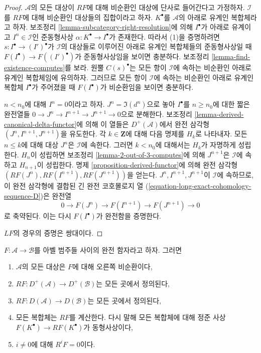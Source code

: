 \begin{proof}
$\mathcal{A}$의 모든 대상이 $RF$에 대해 비순환인 대상에 단사로
들어간다고 가정하자. $\mathcal{I}$를 $RF$에 대해 비순환인 대상들의
집합이라고 하자. $K^\bullet$를 $\mathcal{A}$의 아래로 유계인
복합체라고 하자. 보조정리 \ref{lemma-subcategory-right-resolution}에 의해
$I^\bullet$가 아래로 유계이고 $I^n \in \mathcal{I}$인 준동형사상
$\alpha : K^\bullet \to I^\bullet$가 존재한다. 따라서 (1)을 증명하려면
$s : I^\bullet \to (I')^\bullet$가 $\mathcal{I}$의 대상들로 이루어진
아래로 유계인 복합체들의 준동형사상일 때
$F(I^\bullet) \to F((I')^\bullet)$가 준동형사상임을 보이면 충분하다.
보조정리 \ref{lemma-find-existence-computes}를 보라.
원뿔 $C(s)^\bullet$는 모든 항이 $\mathcal{I}$에 속하는 비순환인
아래로 유계인 복합체임에 유의하자. 그러므로 모든 항이
$\mathcal{I}$에 속하는 비순환인 아래로 유계인 복합체 $I^\bullet$가
주어졌을 때 $F(I^\bullet)$가 비순환임을 보이면 충분하다.

\medskip\noindent
$n < n_0$에 대해 $I^n = 0$이라고 하자. $J^n = \Im(d^n)$으로 놓아
$I^\bullet$를 $n \geq n_0$에 대한 짧은 완전열들
$0 \to J^n \to I^{n + 1} \to J^{n + 1} \to 0$으로 분해한다.
보조정리 \ref{lemma-derived-canonical-delta-functor}에 의해 이 열들은
$D^+(\mathcal{A})$에서 완전 삼각형
$(J^n, I^{n + 1}, J^{n + 1})$을 유도한다.
각 $k \in \mathbf{Z}$에 대해 다음 명제를 $H_k$로 나타내자.
모든 $n \leq k$에 대해 대상 $J^n$은 $\mathcal{I}$에 속한다.
그러면 $k < n_0$에 대해서는 $H_k$가 자명하게 성립한다.
$H_n$이 성립하면 보조정리 \ref{lemma-2-out-of-3-computes}에 의해
$J^{n + 1}$은 $\mathcal{I}$에 속하고 $H_{n + 1}$이 성립한다.
명제 \ref{proposition-derived-functor}에 의해 완전 삼각형
$(RF(J^n), RF(I^{n + 1}), RF(J^{n + 1}))$을 얻는다.
$J^n, I^{n + 1}, J^{n + 1}$이 $\mathcal{I}$에 속하므로, 이 완전
삼각형에 결합된 긴 완전 코호몰로지 열
(\ref{equation-long-exact-cohomology-sequence-D})은 완전열
$$
0 \to F(J^n) \to F(I^{n + 1}) \to F(J^{n + 1}) \to 0
$$
로 축약된다. 이는 다시 $F(I^\bullet)$가 완전함을 증명한다.

\medskip\noindent
$LF$의 경우의 증명은 쌍대이다.
\end{proof}

\begin{lemma}
\label{lemma-right-derived-exact-functor}
$F : \mathcal{A} \to \mathcal{B}$를 아벨 범주들 사이의 완전 함자라고 하자.
그러면
\begin{enumerate}
\item $\mathcal{A}$의 모든 대상은 $F$에 대해 오른쪽 비순환이다,
\item $RF : D^{+}(\mathcal{A}) \to D^{+}(\mathcal{B})$는 모든 곳에서 정의된다,
\item $RF : D(\mathcal{A}) \to D(\mathcal{B})$는 모든 곳에서 정의된다,
\item 모든 복합체는 $RF$를 계산한다. 다시 말해 모든 복합체에 대해
정준 사상 $F(K^\bullet) \to RF(K^\bullet)$가 동형사상이다,
\item $i \not = 0$에 대해 $R^iF = 0$이다.
\end{enumerate}
\end{lemma}

